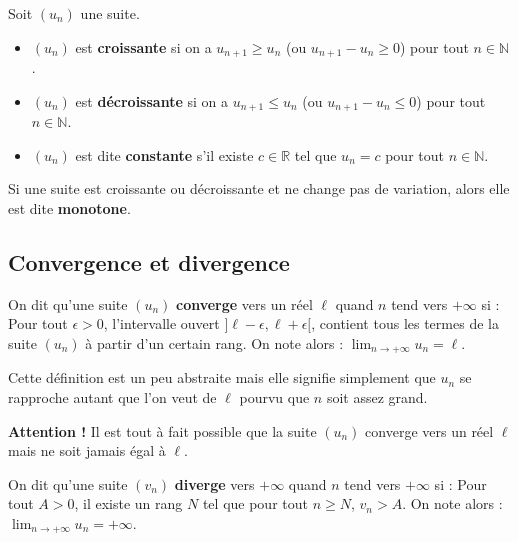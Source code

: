 	\begin{formula}[Définition]
		Soit $(u_n)$ une suite.
		\begin{itemize}
			\item $(u_n)$ est \textbf{croissante} si on a $u_{n+1} \geq u_n$ (ou $u_{n+1} - u_n \geq 0$) pour tout $n \in \mathbb{N}$.
			\item $(u_n)$ est \textbf{décroissante} si on a $u_{n+1} \leq u_n$ (ou $u_{n+1} - u_n \leq 0$) pour tout $n \in \mathbb{N}$.
			\item $(u_n)$ est dite \textbf{constante} s'il existe $c \in \mathbb{R}$ tel que $u_n = c$ pour tout $n \in \mathbb{N}$.
		\end{itemize}
	\end{formula}
	
	Si une suite est croissante ou décroissante et ne change pas de variation, alors elle est dite \textbf{monotone}.
	
	\subsection{Convergence et divergence}
	
	\begin{formula}[Convergence]
		On dit qu'une suite $(u_n)$ \textbf{converge} vers un réel $\ell$ quand $n$ tend vers $+\infty$ si :
		\newpar
		Pour tout $\epsilon > 0$, l'intervalle ouvert $]\ell-\epsilon, \ell+\epsilon[$, contient tous les termes de la suite $(u_n)$ à partir d'un certain rang. On note alors : $\lim_{n \rightarrow +\infty} u_n = \ell$.
	\end{formula}
	
	\begin{tip}
		Cette définition est un peu abstraite mais elle signifie simplement que $u_n$ se rapproche autant que l'on veut de $\ell$ pourvu que $n$ soit assez grand.
	\end{tip}
	
	\textbf{Attention !} Il est tout à fait possible que la suite $(u_n)$ converge vers un réel $\ell$ mais ne soit jamais égal à $\ell$.
	
	\begin{formula}
		On dit qu'une suite $(v_n)$ \textbf{diverge} vers $+\infty$ quand $n$ tend vers $+\infty$ si :
		\newpar
		Pour tout $A > 0$, il existe un rang $N$ tel que pour tout $n \geq N$, $v_n > A$. On note alors : $\lim_{n \rightarrow +\infty} u_n = +\infty$.
	\end{formula}
	
